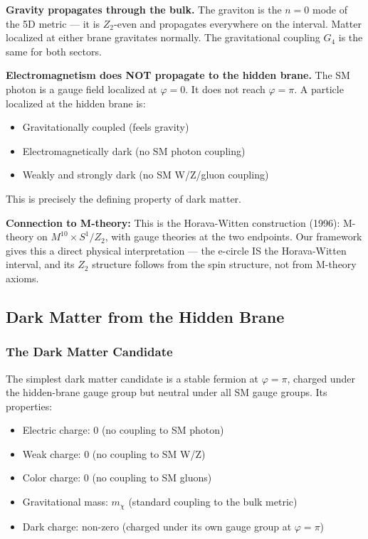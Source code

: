 \documentclass[aps,prd,preprint,superscriptaddress,longbibliography,floatfix]{revtex4-2}
\theoremstyle{remark}
\begin{document}
\textbf{Gravity propagates through the bulk.} The graviton is the $n = 0$ mode of the 5D metric --- it is $Z_{2}$-even and propagates everywhere on the interval. Matter localized at either brane gravitates normally. The gravitational coupling $G_{4}$ is the same for both sectors.

\textbf{Electromagnetism does NOT propagate to the hidden brane.} The SM photon is a gauge field localized at $\varphi = 0$. It does not reach $\varphi = \pi$. A particle localized at the hidden brane is:


\begin{itemize}
  \item Gravitationally coupled (feels gravity)
  \item Electromagnetically dark (no SM photon coupling)
  \item Weakly and strongly dark (no SM W/Z/gluon coupling)
\end{itemize}

This is precisely the defining property of dark matter.

\textbf{Connection to M-theory:} This is the Horava-Witten construction (1996): M-theory on $M^{10} \times S^{1}/Z_{2}$, with gauge theories at the two endpoints. Our framework gives this a direct physical interpretation --- the e-circle IS the Horava-Witten interval, and its $Z_{2}$ structure follows from the spin structure, not from M-theory axioms.



\subsection{Dark Matter from the Hidden Brane}


\subsubsection{The Dark Matter Candidate}

The simplest dark matter candidate is a stable fermion at $\varphi = \pi$, charged under the hidden-brane gauge group but neutral under all SM gauge groups. Its properties:


\begin{itemize}
  \item Electric charge: 0 (no coupling to SM photon)
  \item Weak charge: 0 (no coupling to SM W/Z)
  \item Color charge: 0 (no coupling to SM gluons)
  \item Gravitational mass: $m_\chi$ (standard coupling to the bulk metric)
  \item Dark charge: non-zero (charged under its own gauge group at $\varphi = \pi$)
\end{itemize}
\end{document}
